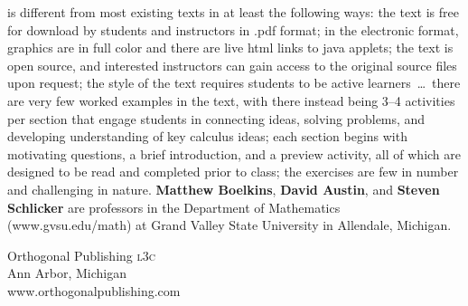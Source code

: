 \documentclass[12pt]{article}
\begin{document}
\fontsize{12pt}{18pt}\selectfont
{\textsf{}} is different from most existing texts in at least the following ways:
the text is free for download by students and instructors  \framebreak in .pdf format;
in the electronic format, graphics  are in full color \framebreak and there are live 
html links to java applets;
the text  is open  source, \framebreak and   interested instructors
 can gain access to the original source files upon request;
the style of the text requires students to be active learners~\dots~there are very few worked examples in the text, with there
\framebreak  instead being 3--4 activities per section that engage students in
 connecting \framebreak ideas, solving problems, and developing understanding of 
key calculus  ideas;
 each section begins with motivating questions, a brief introduction, 
and a preview activity, all of which are designed to be read and completed
 prior to class;
 the exercises are few in number and challenging in nature.\hfill\framebreak
{\textsf{{\textbf{\color{covergreen}Matthew Boelkins}}}}, {\textsf{{\textbf{\color{covergreen}David Austin}}}}, and {\textsf{{\textbf{\color{covergreen}Steven Schlicker}}}} are professors in the
Department of Mathematics (www.gvsu.edu/math) at Grand Valley State University in Allendale, Michigan.
\hfill 
\framebreak
\begin{flushleft}\qquad
\fontsize{10pt}{12pt}\selectfont
\begin{parbox}{2in}{
Orthogonal Publishing \textsc{l3c} \\
Ann Arbor, Michigan \\
www.orthogonalpublishing.com}
\end{parbox}
\end{flushleft}
\end{document}
